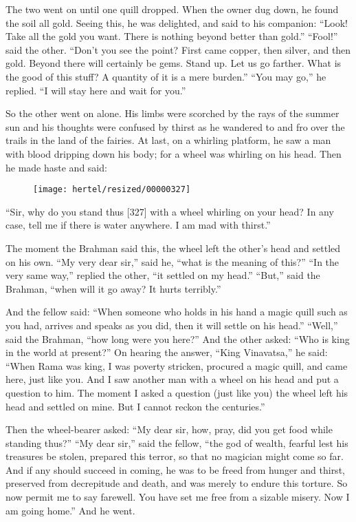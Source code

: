 \documentclass[article, twoside, 10pt]{memoir}
\begin{document}
The two went on until one quill dropped. When the owner dug down,
he found the soil all gold. Seeing this, he was delighted, and said
to his companion:
``Look! Take all the gold you want. There is nothing beyond better than gold.''
``Fool!'' said the other.
``Don't you see the point? First came copper, then silver, and then gold. Beyond there will certainly be gems. Stand up. Let us go farther. What is the good of this stuff? A quantity of it is a mere burden.''
``You may go,'' he replied. ``I will stay here and wait for you.''

So the other went on alone. His limbs were scorched by the rays of
the summer sun and his thoughts were confused by thirst as he
wandered to and fro over the trails in the land of the fairies. At
last, on a whirling platform, he saw a man with blood dripping down
his body; for a wheel was whirling on his head. Then he made haste
and said:
\begin{figure}[p]\texttt{[image: hertel/resized/00000327]}\end{figure}``Sir, why do you stand thus [327] with a wheel whirling on your head? In any case, tell me if there is water anywhere. I am mad with thirst.''

The moment the Brahman said this, the wheel left the other's head
and settled on his own. ``My very dear sir,'' said he,
``what is the meaning of this?'' ``In the very same way,'' replied
the other, ``it settled on my head.'' ``But,'' said the Brahman,
``when will it go away? It hurts terribly.''

And the fellow said:
``When someone who holds in his hand a magic quill such as you had, arrives and speaks as you did, then it will settle on his head.''
``Well,'' said the Brahman, ``how long were you here?'' And the
other asked: ``Who is king in the world at present?'' On hearing
the answer, ``King Vinavatsa,'' he said:
``When Rama was king, I was poverty stricken, procured a magic quill, and came here, just like you. And I saw another man with a wheel on his head and put a question to him. The moment I asked a question (just like you) the wheel left his head and settled on mine. But I cannot reckon the centuries.''

Then the wheel-bearer asked:
``My dear sir, how, pray, did you get food while standing thus?''
``My dear sir,'' said the fellow,
``the god of wealth, fearful lest his treasures be stolen, prepared this terror, so that no magician might come so far. And if any should succeed in coming, he was to be freed from hunger and thirst, preserved from decrepitude and death, and was merely to endure this torture. So now permit me to say farewell. You have set me free from a sizable misery. Now I am going home.''
And he went.
\end{document}
